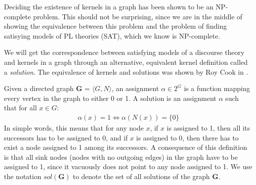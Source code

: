 Deciding the existence of kernels in a graph has been shown to be an NP-complete\cite{chvatal} problem.
This should not be surprising, since we are in the middle of showing the equivalence between this problem and the problem of finding satisying models of PL theories (SAT), which we know is NP-complete.

We will get the correspondence between satisfying models of a discourse theory and kernels in a graph through an alternative, equivalent kernel definition called a \textit{solution}.
The equivalence of kernels and solutions was shown by Roy Cook in \cite{cook}.

Given a directed graph \textbf{G} = $\langle G,N \rangle$, an assignment $\alpha \in 2^G$ is a function mapping every vertex in the graph to either 0 or 1.
A solution is an assignment $\alpha$ such that for all $x \in G:$
\begin{align}
  \alpha(x) = 1 \iff \alpha(N(x)) = \{ 0 \}
\end{align}
In simple words, this means that for any node $x$, if $x$ is assigned to 1, then all its successors has to be assigned to 0, and if $x$ is assigned to 0, then there has to exist a node assigned to 1 among its successors.
A consequence of this definition is that all sink nodes (nodes with no outgoing edges) in the graph have to be assigned to 1, since it vacuously does not point to any node assigned to 1.
We use the notation $sol(\mathbf{G})$ to denote the set of all solutions of the graph \textbf{G}.
